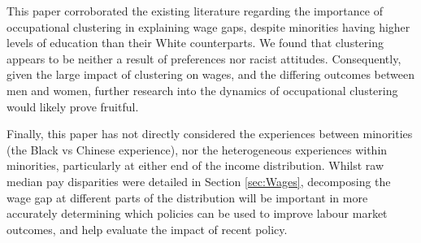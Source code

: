 \documentclass[class=article, crop=false]{standalone}
\begin{document}
This paper corroborated the existing literature regarding the importance of occupational clustering in explaining wage gaps, despite minorities having higher levels of education than their White counterparts. We found that clustering appears to be neither a result of preferences nor racist attitudes. Consequently, given the large impact of clustering on wages, and the differing outcomes between men and women, further research into the dynamics of occupational clustering would likely prove fruitful.


Finally, this paper has not directly considered the experiences between minorities (the Black vs Chinese experience), nor the heterogeneous experiences within minorities, particularly at either end of the income distribution. Whilst raw median pay disparities were detailed in Section \ref{sec:Wages}, decomposing the wage gap at different parts of the distribution will be important in more accurately determining which policies can be used to improve labour market outcomes, and help evaluate the impact of recent policy.

\ifstandalone

\fi
\end{document}
